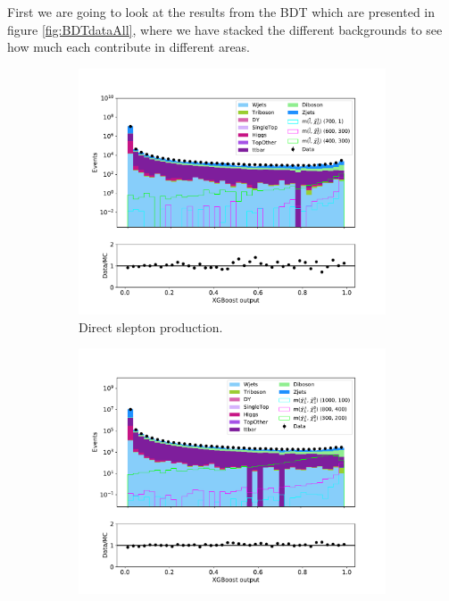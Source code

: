 First we are going to look at the results from the BDT which are presented in figure \ref{fig:BDTdataAll}, where we have stacked the different backgrounds to see how much each contribute in different areas. 
\begin{figure}[H]
    \centering
    \begin{subfigure}[t!]{0.49\textwidth}
        \includegraphics[width = \textwidth]{Figures/Stacked/stackedplot_BDT_All_level_slepslep.pdf}
        \caption{Direct slepton production.}
        \label{fig:BDTdataAllSlepSlep}
    \end{subfigure}
    \begin{subfigure}[t!]{0.49\textwidth}
        \includegraphics[width = \textwidth]{Figures/Stacked/stackedplot_BDT_All_level_slepsnu.pdf}

\end{subfigure}
\end{figure}
